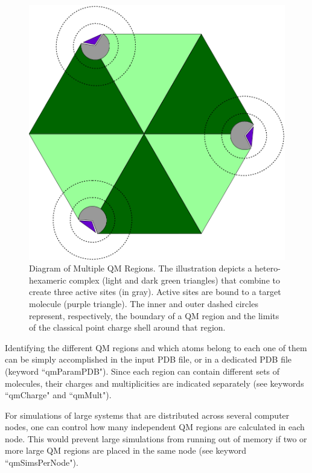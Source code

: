 \begin{figure}[tbp]
\centering
\includegraphics[width=5in]{figures/MultipleQMDiagram.png}
\caption[Diagram of Multiple Grid Regions]{%
Diagram of Multiple QM Regions. 
The illustration depicts a hetero-hexameric complex 
(light and dark green triangles) that combine to create three active sites 
(in gray). Active sites are bound to a target molecule (purple triangle). 
The inner and outer dashed circles represent, respectively, the boundary 
of a QM region and the limits of the classical point charge shell around 
that region.
}
\label{fig:qmmm_multiple_grid}
\end{figure}

Identifying the different QM regions and which atoms belong to each 
one of them can be simply accomplished in the input PDB file, 
or in a dedicated PDB file (keyword ``qmParamPDB"). Since each region 
can contain different sets of molecules, their charges and multiplicities 
are indicated separately (see keywords ``qmCharge" and ``qmMult").

For simulations of large systems that are distributed across several 
computer nodes, one can control how many independent QM regions are 
calculated in each node. This would prevent large simulations from 
running out of memory if two or more large QM regions are placed 
in the same node (see keyword ``qmSimsPerNode").


